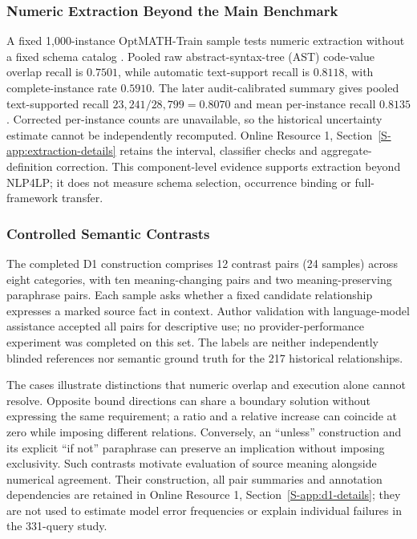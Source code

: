 \documentclass[pdflatex,iicol,sn-basic,Numbered]{sn-jnl}
\begin{document}
\subsubsection{Numeric Extraction Beyond the Main Benchmark}
\label{subsec:exp_external_validation}
A fixed 1,000-instance OptMATH-Train sample tests numeric extraction without a fixed schema catalog \cite{lu2025optmath}. Pooled raw abstract-syntax-tree (AST) code-value overlap recall is $0.7501$, while automatic text-support recall is $0.8118$, with complete-instance rate $0.5910$. The later audit-calibrated summary gives pooled text-supported recall $23{,}241/28{,}799=0.8070$ and mean per-instance recall $0.8135$. Corrected per-instance counts are unavailable, so the historical uncertainty estimate cannot be independently recomputed. Online Resource 1, Section~\ref{S-app:extraction-details} retains the interval, classifier checks and aggregate-definition correction. This component-level evidence supports extraction beyond NLP4LP; it does not measure schema selection, occurrence binding or full-framework transfer.



\subsubsection{Controlled Semantic Contrasts}
\label{subsec:d1}
The completed D1 construction comprises 12 contrast pairs (24 samples) across eight categories, with ten meaning-changing pairs and two meaning-preserving paraphrase pairs. Each sample asks whether a fixed candidate relationship expresses a marked source fact in context. Author validation with language-model assistance accepted all pairs for descriptive use; no provider-performance experiment was completed on this set. The labels are neither independently blinded references nor semantic ground truth for the 217 historical relationships.

The cases illustrate distinctions that numeric overlap and execution alone cannot resolve. Opposite bound directions can share a boundary solution without expressing the same requirement; a ratio and a relative increase can coincide at zero while imposing different relations. Conversely, an ``unless'' construction and its explicit ``if not'' paraphrase can preserve an implication without imposing exclusivity. Such contrasts motivate evaluation of source meaning alongside numerical agreement. Their construction, all pair summaries and annotation dependencies are retained in Online Resource 1, Section~\ref{S-app:d1-details}; they are not used to estimate model error frequencies or explain individual failures in the 331-query study.
\end{document}

